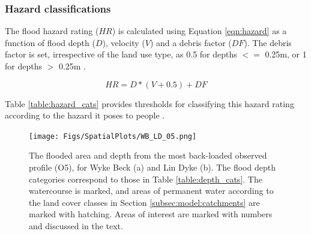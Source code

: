 \documentclass[APA,Times2COL]{WileyNJDv5}
\begin{document}
\subsubsection{Hazard classifications}\label{subsec:hazard}
The flood hazard rating ($HR$) is calculated using Equation \ref{eqn:hazard} as a function of flood depth ($D$), velocity ($V$) and a debris factor ($DF$). The debris factor is set, irrespective of the land use type, as 0.5 for depths $<=$ 0.25m, or 1 for depths $>$ 0.25m \citep{envagency2019}.

\begin{equation}
HR = D * (V +0.5) + DF
 \label{eqn:hazard}
\end{equation}

Table \ref{table:hazard_cats} provides thresholds for classifying this hazard rating according to the hazard it poses to people \citep{surendran2008supplementary}.


\begin{figure}[h!]
  \centering
 \texttt{[image: Figs/SpatialPlots/WB\_LD\_05.png]}
 
\caption{The flooded area and depth from the most back-loaded observed profile (O5), for Wyke Beck (a) and Lin Dyke (b).  The flood depth categories correspond to those in Table \ref{table:depth_cats}. The watercourse is marked, and areas of permanent water according to the land cover classes in Section \ref{subsec:model:catchments} are marked with hatching. Areas of interest are marked with numbers and discussed in the text.}\label{fig:flooded_area_spatial_BL} 
\end{figure}
\end{document}
